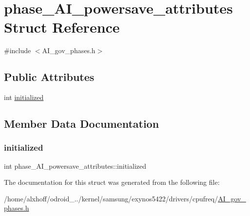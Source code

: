 \hypertarget{structphase__AI__powersave__attributes}{}\section{phase\+\_\+\+A\+I\+\_\+powersave\+\_\+attributes Struct Reference}
\label{structphase__AI__powersave__attributes}


{\ttfamily \#include $<$A\+I\+\_\+gov\+\_\+phases.\+h$>$}

\subsection*{Public Attributes}
\begin{DoxyCompactItemize}
\item 
int \hyperlink{structphase__AI__powersave__attributes_a88b5fd6834c3fef2e5cef8c616d999ab}{initialized}
\end{DoxyCompactItemize}


\subsection{Member Data Documentation}
\mbox{\label{structphase__AI__powersave__attributes_a88b5fd6834c3fef2e5cef8c616d999ab}} 
\subsubsection{\texorpdfstring{initialized}{initialized}}
{\footnotesize\ttfamily int phase\+\_\+\+A\+I\+\_\+powersave\+\_\+attributes\+::initialized}



The documentation for this struct was generated from the following file\+:\begin{DoxyCompactItemize}
\item 
/home/alxhoff/odroid\+\_../kernel/samsung/exynos5422/drivers/cpufreq/\hyperlink{AI__gov__phases_8h}{A\+I\+\_\+gov\+\_\+phases.\+h}\end{DoxyCompactItemize}
